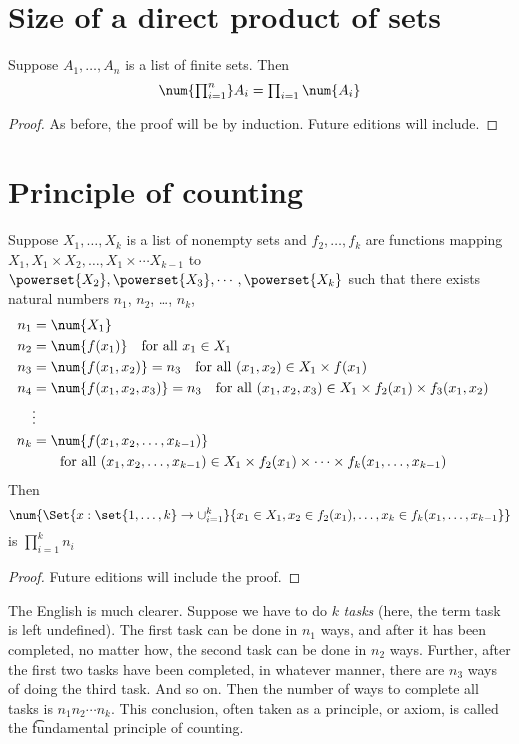 
\section*{Size of a direct product of sets}

\begin{proposition}
Suppose $A_1, \dots , A_n$ is a list of finite sets.
Then
\[
\textstyle
\num{\prod_{i =1 }^{n}} A_i = \prod_{i =1 } \num{A_i}
\]
\end{proposition}

\begin{proof}As before, the proof will be by induction. Future editions will include.\end{proof}
\section*{Principle of counting}

\begin{proposition}
Suppose $X_1, \dots , X_k$ is a list of nonempty sets and $f_2, \dots , f_k$ are functions mapping $X_1, X_1 \times  X_2, \dots , X_1 \times  \cdots X_{k-1}$ to $\powerset{X_2}, \powerset{X_3}, \cdots, \powerset{X_k}$ such that there exists natural numbers $n_1$, $n_2$, \dots , $n_k$,
\[
\begin{aligned}
n_1 &= \num{X_1} \\
n_2 &= \num{f(x_1)} \quad \text{for all } x_1 \in X_1 \\
n_3 &= \num{f(x_1, x_2)} = n_3 \quad \text{for all } (x_1, x_2) \in X_1 \times  f(x_1) \\
n_4 &= \num{f(x_1, x_2, x_3)} = n_3 \quad \text{for all } (x_1, x_2, x_3) \in X_1 \times  f_2(x_1) \times  f_3(x_1, x_2) \\
&\vdots&\\
n_k &= \num{f(x_1, x_2, \dots , x_{k-1})} \quad \\& \quad\quad \text{for all } (x_1, x_2, \dots , x_{k-1}) \in X_1 \times f_2(x_1) \times  \cdots \times  f_k(x_1, \dots , x_{k-1}) \\
\end{aligned}
\]
Then
\[
\num{\Set{x: \set{1, \dots , k} \to \cup_{i = 1}^{k}}{x_1 \in X_1, x_2 \in f_2(x_1), \dots , x_k \in f_k(x_1, \dots , x_{k-1}}}
\]
is $\prod_{i = 1}^{k} n_i$
\end{proposition}

\begin{proof}Future editions will include the proof.\end{proof}
The English is much clearer.
Suppose we have to do $k$ \textit{tasks} (here, the term task is left undefined).
The first task can be done in $n_1$ ways, and after it has been completed, no matter how, the second task can be done in $n_2$ ways.
Further, after the first two tasks have been completed, in whatever manner, there are $n_3$ ways of doing the third task.
And so on.
Then the number of ways to complete all tasks is $n_1 n_2 \cdots n_k$.
This conclusion, often taken as a principle, or axiom, is called the \t{fundamental principle of counting}.

